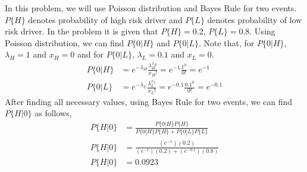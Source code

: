 \documentclass[12pt]{article}
\begin{document}
In this problem, we will use Poisson distribution and Bayes Rule for two events. $P\{H\}$ denotes probability of high risk driver and $P\{L\}$ denotes probability of low risk driver. In the problem it is given that $P\{H\} = 0.2$, $P\{L\} = 0.8$. Using Poisson distribution, we can find $P\{0 | H\}$ and $P\{0 | L\}$. Note that, for $P\{0 | H\}$, $\lambda_H = 1$ and $x_H = 0$ and for $P\{0 | L\}$, $\lambda_L = 0.1$ and $x_L = 0$.
\begin{equation}
\begin{split}
	P\{0 | H\} & = e^{-\lambda_H} \frac{\lambda_H^{x_H}}{x_H!} = e^{-1} \frac{1^0}{0!} = e^{-1} \\
	P\{0 | L\} & = e^{-\lambda_L} \frac{\lambda_L^{x_L}}{x_L!} = e^{-0.1} \frac{0.1^0}{0!} = e^{-0.1}
\end{split}
\end{equation}
After finding all necessary values, using Bayes Rule for two events, we can find $P\{H | 0\}$ as follows,
\begin{equation}
\begin{split}
	P\{H | 0\} & = \frac{P\{0 | H\}P\{H\}}{P\{0 | H\}P\{H\} + P\{0 | L\}P\{L\}} \\
	P\{H | 0\} & = \frac{(e^{-1})(0.2)}{(e^{-1})(0.2) + (e^{-0.1})(0.8)} \\
	P\{H | 0\} & = 0.0923
\end{split}
\end{equation}
\end{document}
